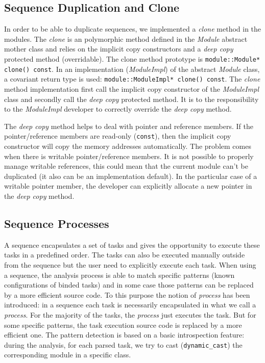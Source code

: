 \subsection{Sequence Duplication and Clone}

In order to be able to duplicate sequences, we implemented a \emph{clone} method
in the modules. The \emph{clone} is an polymorphic method defined in the
\emph{Module} abstract mother class and relies on the implicit copy constructors
and a \emph{deep copy} protected method (overridable). The clone method
prototype is \verb|module::Module* clone() const|. In an implementation
(\emph{ModuleImpl}) of the abstract \emph{Module} class, a covariant return type
is used: \verb|module::ModuleImpl* clone() const|. The \emph{clone} method
implementation first call the implicit copy constructor of the \emph{ModuleImpl}
class and secondly call the \emph{deep copy} protected method. It is to the
responsibility to the \emph{ModuleImpl} developer to correctly override the
\emph{deep copy} method.

The \emph{deep copy} method helps to deal with pointer and reference members.
If the pointer/reference members are read-only (\verb|const|), then the implicit
copy constructor will copy the memory addresses automatically. The problem comes
when there is writable pointer/reference members. It is not possible to properly
manage writable references, this could mean that the current module can't be
duplicated (it also can be an implementation default). In the particular case of
a writable pointer member, the developer can explicitly allocate a new pointer
in the \emph{deep copy} method.

\subsection{Sequence Processes}

A sequence encapsulates a set of tasks and gives the opportunity to execute
these tasks in a predefined order. The tasks can also be executed manually
outside from the sequence but the user need to explicitly execute each task.
When using a sequence, the analysis process is able to match specific patterns
(known configurations of binded tasks) and in some case those patterns can be
replaced by a more efficient source code. To this purpose the notion of
\emph{process} has been introduced: in a sequence each task is necessarily
encapsulated in what we call a \emph{process}. For the majority of the tasks,
the \emph{process} just executes the task. But for some specific patterns, the
task execution source code is replaced by a more efficient one. The pattern
detection is based on a \Cxx basic introspection feature: during the analysis,
for each parsed task, we try to cast (\verb|dynamic_cast|) the corresponding
module in a specific class.


